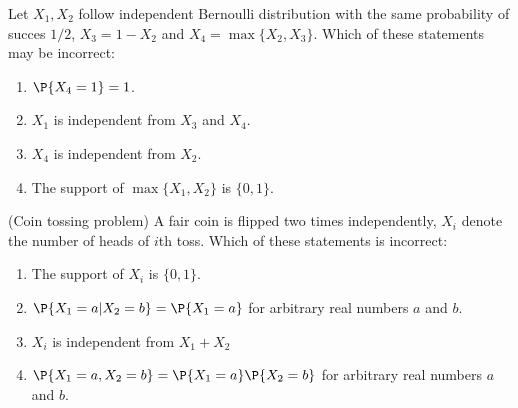 \documentclass[poll_tutorial_format]{subfiles}
\begin{document}
	
	\begin{exercise}
		Let $X_1, X_2$ follow independent Bernoulli distribution with the same probability of succes $1/2$, $X_3=1-X_2$ and $X_4=\max\{X_2, X_3\}$. 
		Which of these statements may be incorrect: 
		\begin{enumerate}
			\item $\P{X_4=1}=1$.
			\item $X_1$ is independent from $X_3$ and $X_4$.
			\item $X_4$ is independent from $X_2$.
			\item The support of $\max\{X_1,X_2\}$ is $\{0,1\}$.
		\end{enumerate}
	\end{exercise}
	
	
	\begin{exercise}
		(Coin tossing problem) A fair coin is flipped two times independently, $X_i$ denote the number of heads of $i$th toss. 
		Which of these statements is incorrect: 
		\begin{enumerate}
			\item The support of $X_i$ is $\{0,1\}$.
			\item $\P{X_1=a|X_2=b}=\P{X_1=a}$ for arbitrary real numbers $a$ and $b$.		
			\item $X_i$ is independent from $X_1+X_2$
			\item $\P{X_1=a, X_2=b}=\P{X_1=a}\P{X_2=b}$ for arbitrary real numbers $a$ and $b$.		
		\end{enumerate}
	\end{exercise}
	 
	
	
	
	
	
	
\end{document}
